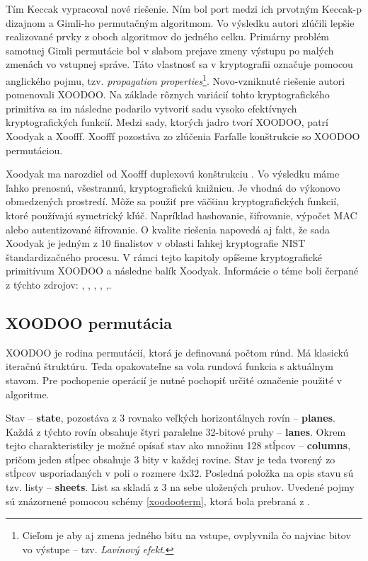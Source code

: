 Tím Keccak vypracoval nové riešenie. Ním bol port medzi ich prvotným Keccak-p dizajnom a Gimli-ho \cite{bernstein2017gimli} permutačným algoritmom. Vo výsledku autori zlúčili lepšie realizované prvky z oboch algoritmov do jedného celku. Primárny problém samotnej Gimli permutácie bol v slabom prejave zmeny výstupu po malých zmenách vo vstupnej správe. Táto vlastnosť sa v kryptografii označuje pomocou anglického pojmu, tzv. \textit{propagation properties}\footnote{Cieľom je aby aj zmena jedného bitu na vstupe, ovplyvnila čo najviac bitov vo výstupe -- tzv. \textit{Lavínový efekt}.}. Novo-vzniknuté riešenie autori pomenovali XOODOO. Na základe rôznych variácií tohto kryptografického primitíva sa im následne podarilo vytvoriť sadu vysoko efektívnych kryptografických funkcií. 
Medzi sady, ktorých jadro tvorí XOODOO, patrí Xoodyak a Xoofff. Xoofff pozostáva zo zlúčenia Farfalle konštrukcie \cite{farfalle} so XOODOO permutáciou. 

Xoodyak ma narozdiel od Xoofff duplexovú konštrukciu \cite{duplex}. Vo výsledku máme ľahko prenosnú, všestrannú, kryptografickú knižnicu. Je vhodná do výkonovo obmedzených prostredí. Môže sa použiť pre väčšinu kryptografických funkcií, ktoré používajú symetrický kľúč. Napríklad hashovanie, šifrovanie, výpočet MAC alebo autentizované šifrovanie. O kvalite riešenia napovedá aj fakt, že sada Xoodyak je jedným z 10 finalistov v oblasti ľahkej kryptografie NIST štandardizačného procesu.
V rámci tejto kapitoly opíšeme kryptografické primitívum XOODOO a následne balík Xoodyak. Informácie o téme boli čerpané z týchto zdrojov: \cite{tkecak}, \cite{xd}, \cite{xcb}, \cite{xoodoocb}, \cite{xdupdate},\cite{xdr1}.
\subsection{XOODOO permutácia}
XOODOO je rodina permutácií, ktorá je definovaná počtom rúnd. Má klasickú iteračnú štruktúru. Teda opakovateľne sa vola rundová funkcia s aktuálnym stavom. Pre pochopenie operácií je nutné pochopiť určité označenie použité v algoritme.

Stav -- \textbf{state}, pozostáva z 3 rovnako veľkých horizontálnych rovín -- \textbf{planes}. Každá z týchto rovín obsahuje štyri paralelne 32-bitové pruhy -- \textbf{lanes}. Okrem tejto charakteristiky je možné opísať stav ako množinu 128 stĺpcov -- \textbf{columns}, pričom jeden stĺpec obsahuje 3 bity v každej rovine. Stav je teda tvorený zo stĺpcov usporiadaných v poli o rozmere 4x32. Posledná položka na opis stavu sú tzv. listy -- \textbf{sheets}. List sa skladá z 3 na sebe uložených pruhov. Uvedené pojmy sú znázornené pomocou schémy \ref{xoodooterm}, ktorá bola prebraná z \cite{xcb}.

